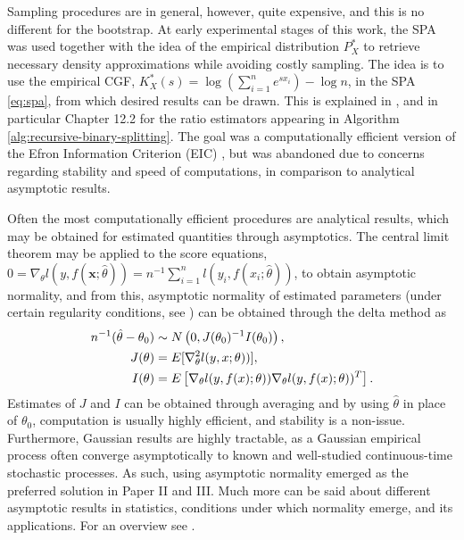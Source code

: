 Sampling procedures are in general, however, quite expensive, and this is no different for the bootstrap.
At early experimental stages of this work, the SPA was used together with the idea of the empirical distribution $P_X^*$ to retrieve necessary density approximations while avoiding costly sampling.
The idea is to use the empirical CGF, $K_X^*(s)=\log\left(\sum_{i=1}^{n} e^{sx_i}\right)-\log n$, in the SPA \eqref{eq:spa}, from which desired results can be drawn. 
This is explained in \citet[Chapter 14]{butler2007saddlepoint}, and in particular Chapter 12.2 for the ratio estimators appearing in Algorithm \ref{alg:recursive-binary-splitting}.
The goal was a computationally efficient version of the Efron Information Criterion (EIC) \citep{ishiguro1997bootstrapping}, but was abandoned due to concerns regarding stability and speed of computations, in comparison to analytical asymptotic results.

Often the most computationally efficient procedures are analytical results, which may be obtained for estimated quantities through asymptotics.
The central limit theorem may be applied to the score equations, $0=\nabla_\theta l(y,f(\mathbf{x};\hat{\theta}))=n^{-1}\sum_{i=1}^{n}l(y_i,f(x_i;\hat{\theta}))$, to obtain asymptotic normality, and from this, asymptotic normality of estimated parameters (under certain regularity conditions, see \citet{vanDerVaart}) can be obtained through the delta method as 
\begin{align}
	n^{-1}(\hat{\theta}-\theta_0) &\sim N\left( 0, J(\theta_0)^{-1}I(\theta_0) \right),\\ 
	J(\theta) &= E[\nabla_\theta^2 l(y,x;\theta))],\notag\\
	I(\theta) &= E\left[ \nabla_\theta l(y,f(x);\theta))\nabla_\theta l(y,f(x);\theta))^T \right].\notag
\end{align}
Estimates of $J$ and $I$ can be obtained through averaging and by using $\hat\theta$ in place of $\theta_0$, computation is usually highly efficient, and stability is a non-issue.
Furthermore, Gaussian results are highly tractable, as a Gaussian empirical process often converge asymptotically to known and well-studied continuous-time stochastic processes.
As such, using asymptotic normality emerged as the preferred solution in Paper II and III.
Much more can be said about different asymptotic results in statistics, conditions under which normality emerge, and its applications. For an overview see \citet{vanDerVaart}.


